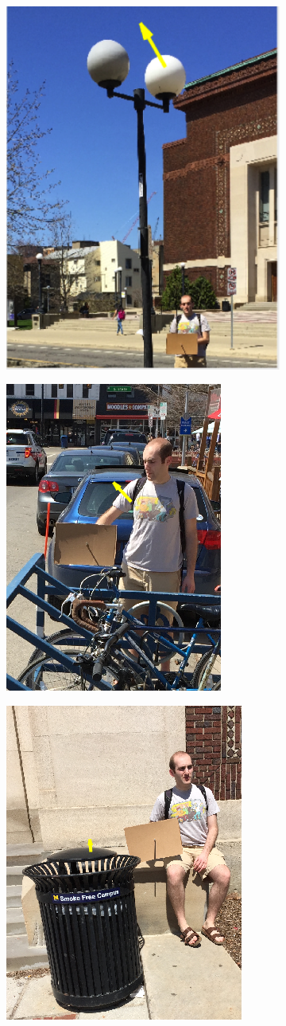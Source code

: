 \documentclass[10pt,twocolumn,letterpaper]{article}
\begin{document}
{\begin{figure}[]
\begin{subfigure}{.5\linewidth}
	  \caption{}
	  \label{fig:sfig2}
	\end{subfigure}
	\begin{subfigure}{.5\linewidth}
	  \centering
		\includegraphics[width=0.5\linewidth]{lamppost.png}
	  \caption{}
	  \label{fig:sfig3}
	\end{subfigure}
	\begin{subfigure}{.5\linewidth}
	  \centering
		\includegraphics[width=0.5\linewidth]{bike_rack_1.png}
	  \caption{}
	  \label{fig:sfig4}
	\end{subfigure}
	\begin{subfigure}{.5\linewidth}
	  \centering
		\includegraphics[width=0.5\linewidth]{garbage_can.png}

\end{subfigure}
\end{figure}}
\end{document}
